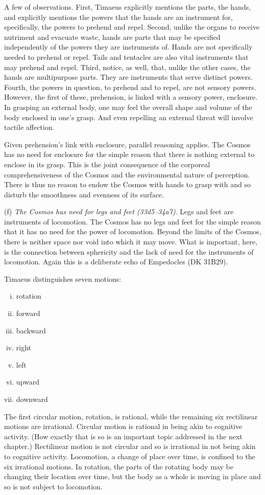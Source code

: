 A few of observations. First, Timaeus explicitly mentions the parts, the hands, and explicitly mentions the powers that the hands are an instrument for, specifically, the powers to prehend and repel. Second, unlike the organs to receive nutriment and evacuate waste, hands are parts that may be specified independently of the powers they are instruments of. Hands are not specifically needed to prehend or repel. Tails and tentacles are also vital instruments that may prehend and repel. Third, notice, as well, that, unlike the other cases, the hands are multipurpose parts. They are instruments that serve distinct powers. Fourth, the powers in question, to prehend and to repel, are not sensory powers. However, the first of these, prehension, is linked with a sensory power, enclosure. In grasping an external body, one may feel the overall shape and volume of the body enclosed in one's grasp. And even repelling an external threat will involve tactile affection. 

Given prehension's link with enclosure, parallel reasoning applies. The Cosmos has no need for enclosure for the simple reason that there is nothing external to enclose in its grasp. This is the joint consequence of the corporeal comprehensiveness of the Cosmos and the environmental nature of perception. There is thus no reason to endow the Cosmos with hands to grasp with and so disturb the smoothness and evenness of its surface.

(f) \emph{The Cosmos has need for legs and feet (33d5–34a7)}. Legs and feet are instruments of locomotion. The Cosmos has no legs and feet for the simple reason that it has no need for the power of locomotion. Beyond the limits of the Cosmos, there is neither space nor void into which it may move. What is important, here, is the connection between sphericity and the lack of need for the instruments of locomotion. Again this is a deliberate echo of Empedocles (DK 31B29).

Timaeus distinguishes seven motions:
\begin{enumerate}[(i)]
	\item rotation
	\item forward
	\item backward
	\item right
	\item left
	\item upward
	\item downward
\end{enumerate}
The first circular motion, rotation, is rational, while the remaining six rectilinear motions are irrational. Circular motion is rational in being akin to cognitive activity. (How exactly that is so is an important topic addressed in the next chapter.) Rectilinear motion is not circular and so is irrational in not being akin to cognitive activity. Locomotion, a change of place over time, is confined to the six irrational motions. In rotation, the parts of the rotating body may be changing their location over time, but the body as a whole is moving in place and so is not subject to locomotion. 


